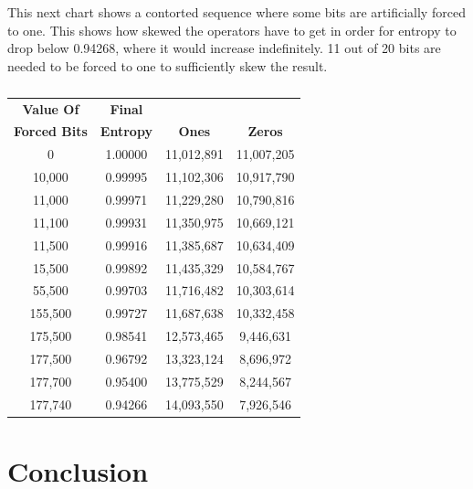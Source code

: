 \documentclass[letterpaper]{article}
\begin{document}
\begin{multicols}{2}
    This next chart shows a contorted sequence where some bits are artificially forced to one. This shows how skewed the operators have to get in order for entropy to drop below 0.94268, where it would increase indefinitely. 11 out of 20 bits are needed to be forced to one to sufficiently skew the result.

    \begin{table}[ht]
        \centering
        \begin{tabular}{|c|c|c|c|}
            \hline
            \textbf{Value Of}    & \textbf{Final}   &               &                \\
            \textbf{Forced Bits} & \textbf{Entropy} & \textbf{Ones} & \textbf{Zeros} \\
            \hline
            0                    & 1.00000          & 11,012,891    & 11,007,205     \\
            10,000               & 0.99995          & 11,102,306    & 10,917,790     \\
            11,000               & 0.99971          & 11,229,280    & 10,790,816     \\
            11,100               & 0.99931          & 11,350,975    & 10,669,121     \\
            11,500               & 0.99916          & 11,385,687    & 10,634,409     \\
            15,500               & 0.99892          & 11,435,329    & 10,584,767     \\
            55,500               & 0.99703          & 11,716,482    & 10,303,614     \\
            155,500              & 0.99727          & 11,687,638    & 10,332,458     \\
            175,500              & 0.98541          & 12,573,465    & 9,446,631      \\
            177,500              & 0.96792          & 13,323,124    & 8,696,972      \\
            177,700              & 0.95400          & 13,775,529    & 8,244,567      \\
            177,740              & 0.94266          & 14,093,550    & 7,926,546      \\
            \hline
        \end{tabular}
        \caption{}
    \end{table}

    \section{Conclusion}


\end{multicols}
\end{document}
